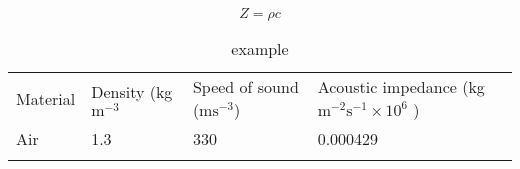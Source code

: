 		\begin{equation}
			Z = \rho c
		\end{equation}

		\begin{table}[ht!]
		\centering
		\begin{tabular}{llll}\hline
		 Material&  Density (kg$\text{m}^{-3}$&  Speed of sound (m$\text{s}^{-3}$)& Acoustic impedance (kg$\text{m}^{-2}$$\text{s}^{-1} \times 10^6$ ) \\
		 Air&  1.3&  330& 0.000429 \\
		 &  & & \\ \hline
		\end{tabular}
		\caption{example}
		\label{tab:tab1}
		\end{table}